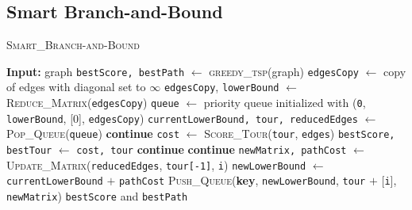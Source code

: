 \documentclass[12pt]{article}
\begin{document}
\newpage

\subsection{Smart Branch-and-Bound}

\begin{algorithm}[H]
    \caption{\textsc{Smart\_Branch-and-Bound}}
    \begin{algorithmic}[1]
        \State \textbf{Input:} graph
        \State \texttt{bestScore, bestPath} $\gets$ \textsc{greedy\_tsp}(graph) 
        \State \texttt{edgesCopy} $\gets$ copy of edges with diagonal set to $\infty$
        \State \texttt{edgesCopy}, \texttt{lowerBound} $\gets$ \textsc{Reduce\_Matrix}(\texttt{edgesCopy})
        \State \texttt{queue} $\gets$ priority queue initialized with (\texttt{0}, \texttt{lowerBound}, [0], \texttt{edgesCopy})
         
            \State \texttt{currentLowerBound, tour, reducedEdges} $\gets$ \textsc{Pop\_Queue}(\texttt{queue}) 
                \State \textbf{continue}
            \EndIf
                \State \texttt{cost} $\gets$ \textsc{Score\_Tour}(\texttt{tour}, \texttt{edges})
                    \State \texttt{bestScore, bestTour} $\gets$ \texttt{cost, tour}
                \EndIf
                \State \textbf{continue}
            \EndIf
                    \State \textbf{continue}
                \EndIf
                \State \texttt{newMatrix, pathCost} $\gets$ \textsc{Update\_Matrix}(\texttt{reducedEdges}, \texttt{tour[-1]}, \texttt{i})
                \State \texttt{newLowerBound} $\gets$ \texttt{currentLowerBound} $+$ \texttt{pathCost}
                    \State \textsc{Push\_Queue}(\textbf{key}, \texttt{newLowerBound}, \texttt{tour} $+$ [\texttt{i}], \texttt{newMatrix}) 
                \EndIf
            \EndFor
        \EndWhile
        \State \Return \texttt{bestScore} and \texttt{bestPath}
    \end{algorithmic}
\end{algorithm}
\end{document}
